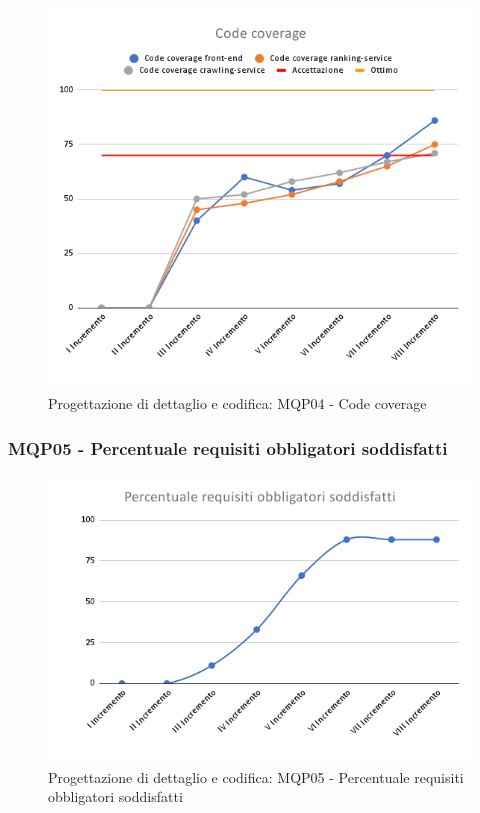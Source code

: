 \begin{figure}[H]
    \centering
    \includegraphics[scale=0.50]{Sezioni/images/pb_prodotto/Code_coverage.png}
    \caption{Progettazione di dettaglio e codifica: MQP04 - Code coverage}
\end{figure}
\subsubsection{MQP05 - Percentuale requisiti obbligatori soddisfatti}
\begin{figure}[H]
    \centering
    \includegraphics[scale=0.50]{Sezioni/images/pb_prodotto/Percentuale_requisiti_obbligatori_soddisfatti.png}
    \caption{Progettazione di dettaglio e codifica: MQP05 - Percentuale requisiti obbligatori soddisfatti}
\end{figure}

